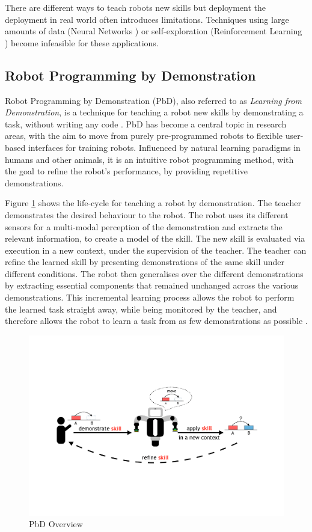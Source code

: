 There are different ways to teach robots new skills but deployment the deployment in real world often introduces limitations. 
Techniques using large amounts of data (Neural Networks \cite{billard2001robust}) or self-exploration (Reinforcement Learning \cite{smart2002effective}) become infeasible for these applications.

\subsection{Robot Programming by Demonstration}

Robot Programming by Demonstration (PbD), also referred to as \textit{Learning from Demonstration}, is a technique for teaching a robot new skills by demonstrating a task, without writing any code \cite{billard2008robot}.
PbD has become a central topic in research areas, with the aim to move from purely pre-programmed robots to flexible user-based interfaces for training robots.
Influenced by natural learning paradigms in humans and other animals, it is an intuitive robot programming method, with the goal to refine the robot's performance, by providing repetitive demonstrations.

Figure \ref{fig:Principle Overview} shows the life-cycle for teaching a robot by demonstration.
The teacher demonstrates the desired behaviour to the robot.
The robot uses its different sensors for a multi-modal perception of the demonstration and extracts the relevant information, to create a model of the skill.
The new skill is evaluated via execution in a new context, under the supervision of the teacher.
The teacher can refine the learned skill by presenting demonstrations of the same skill under different conditions.
The robot then generalises over the different demonstrations by extracting essential components that remained unchanged across the various demonstrations.
This incremental learning process allows the robot to perform the learned task straight away, while being monitored by the teacher, and therefore allows the robot to learn a task from as few demonstrations as possible \cite{billard2008robot}.

  \begin{figure}[h]
    \centering
    \includegraphics[scale=0.7]{figures/PbD-Overview}
    \caption{PbD Overview}
    \label{fig:Principle Overview}
  \end{figure}

